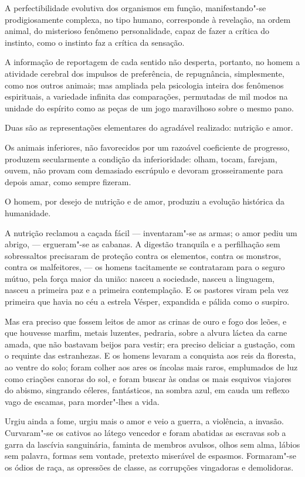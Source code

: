 A perfectibilidade evolutiva dos organismos em função,
manifestando"-se prodigiosamente complexa, no tipo humano, corresponde
à revelação, na ordem animal, do misterioso fenômeno personalidade,
capaz de fazer a crítica do instinto, como o instinto faz a crítica da
sensação. 

A informação de reportagem de cada sentido não desperta,
portanto, no homem a atividade cerebral dos impulsos de preferência, de
repugnância, simplesmente, como nos outros animais; mas ampliada pela
psicologia inteira dos fenômenos espirituais, a variedade infinita das
comparações, permutadas de mil modos na unidade do espírito como as
peças de um jogo maravilhoso sobre o mesmo pano. 

Duas são as representações elementares do agradável realizado: nutrição e amor. 

Os animais inferiores, não favorecidos por um razoável coeficiente de
progresso, produzem secularmente a condição da inferioridade: olham,
tocam, farejam, ouvem, não provam com demasiado escrúpulo e devoram
grosseiramente para depois amar, como sempre fizeram. 

O homem, por
desejo de nutrição e de amor, produziu a evolução histórica da
humanidade. 

A nutrição reclamou a caçada fácil --- inventaram"-se as
armas; o amor pediu um abrigo, --- ergueram"-se as cabanas. A digestão
tranquila e a perfilhação sem sobressaltos precisaram de proteção
contra os elementos, contra os monstros, contra os malfeitores, --- os
homens tacitamente se contrataram para o seguro mútuo, 
pela força maior da união: nasceu a sociedade, nasceu a
linguagem, nasceu a primeira paz e a primeira contemplação. E os
pastores viram pela vez primeira que havia no céu a estrela Vésper,
expandida e pálida como o suspiro. 

Mas era preciso que fossem leitos de
amor as crinas de ouro e fogo dos leões, e que houvesse marfim, metais
luzentes, pedraria, sobre a alvura láctea da carne amada, que não
bastavam beijos para vestir; era preciso deliciar a gustação, com o
requinte das estranhezas. E os homens levaram a conquista aos reis da
floresta, ao ventre do solo; foram colher aos ares os íncolas mais
raros, emplumados de luz como criações canoras do sol, e foram buscar
às ondas os mais esquivos viajores do abismo, singrando céleres,
fantásticos, na sombra azul, em cauda um reflexo vago de escamas, para
morder"-lhes a vida. 

Urgiu ainda a fome, urgiu mais o amor e veio a
guerra, a violência, a invasão. Curvaram"-se os cativos ao látego
vencedor e foram abatidas as escravas sob a garra da lascívia
sanguinária, faminta de membros avulsos, olhos sem alma, lábios sem
palavra, formas sem vontade, pretexto miserável de espasmos.
Formaram"-se os ódios de raça, as opressões de classe, as corrupções
vingadoras e demolidoras. 

